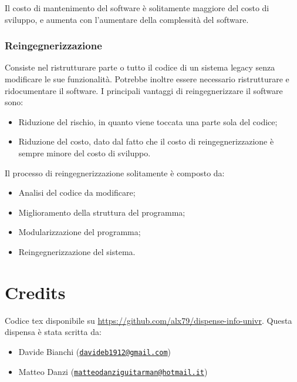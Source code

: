 \documentclass[a4paper, 10pt]{article}
\newcommand{\mail}[1]{\href{mailto:#1}{\texttt{#1}}}
\begin{document}
Il costo di mantenimento del software è solitamente maggiore del costo di sviluppo, e aumenta con l'aumentare della complessità del software. 

\subsubsection{Reingegnerizzazione}
Consiste nel ristrutturare parte o tutto il codice di un sistema legacy senza modificare le sue funzionalità. Potrebbe inoltre essere necessario ristrutturare e ridocumentare il software.
I principali vantaggi di reingegnerizzare il software sono:
\begin{itemize}
	\item Riduzione del rischio, in quanto viene toccata una parte sola del codice;
	\item Riduzione del costo, dato dal fatto che il costo di reingegnerizzazione è sempre minore del costo di sviluppo.
\end{itemize}

Il processo di reingegnerizzazione solitamente è composto da:
\begin{itemize}
	\item Analisi del codice da modificare;
	\item Miglioramento della struttura del programma;
	\item Modularizzazione del programma;
	\item Reingegnerizzazione del sistema.
\end{itemize}

\section{Credits}
Codice tex disponibile su \url{https://github.com/alx79/dispense-info-univr}.
Questa dispensa è stata scritta da:
\begin{itemize}
	\item Davide Bianchi (\mail{davideb1912@gmail.com})
	\item Matteo Danzi (\mail{matteodanziguitarman@hotmail.it})
\end{itemize}
	
	
	
\end{document}
